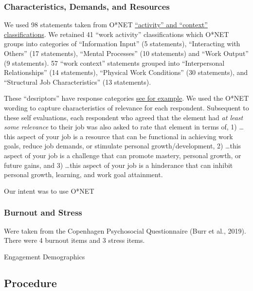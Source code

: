 \documentclass[
  english,
  man]{apa6}
\begin{document}
\hypertarget{characteristics-demands-and-resources}{%
\subsubsection{Characteristics, Demands, and Resources}\label{characteristics-demands-and-resources}}

We used 98 statements taken from O*NET \href{https://www.O*NETonline.org/find/descriptor/result/4.A.1.b.3}{``activity'' and ``context'' classifications}. We retained 41 ``work activity'' classifications which O*NET groups into categories of ``Information Input'' (5 statements), ``Interacting with Others'' (17 statements), ``Mental Processes'' (10 statements) and ``Work Output'' (9 statements). 57 ``work context'' statements grouped into ``Interpersonal Relationships'' (14 statements), ``Physical Work Conditions'' (30 statements), and ``Structural Job Characteristics'' (13 statements).

These ``desriptors'' have response categories \href{https://www.O*NETonline.org/find/descriptor/result/4.C.1.c.2}{see for example}. We used the O*NET wording to capture characteristics of relevance for each respondent. Subsequent to these self evaluations, each respondent who agreed that the element had \emph{at least some relevance} to their job was also asked to rate that element in terms of, 1) \ldots this aspect of your job is a resource that can be functional in achieving work goals, reduce job demands, or stimulate personal growth/development, 2) \ldots this aspect of your job is a challenge that can promote mastery, personal growth, or future gains, and 3) \ldots this aspect of your job is a hinderance that can inhibit personal growth, learning, and work goal attainment.

Our intent was to use O*NET

\hypertarget{burnout-and-stress}{%
\subsubsection{Burnout and Stress}\label{burnout-and-stress}}

Were taken from the Copenhagen Psychosocial Questionnaire (Burr et al., 2019). There were 4 burnout items and 3 stress items.

Engagement
Demographics

\hypertarget{procedure}{%
\subsection{Procedure}\label{procedure}}
\end{document}
